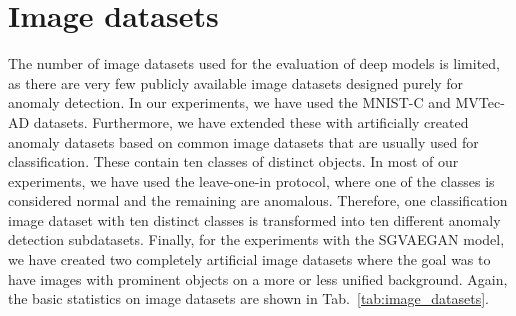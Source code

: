\section{Image datasets} \label{sec:image_datasets}
The number of image datasets used for the evaluation of deep models is limited, as there are very few publicly available image datasets designed purely for anomaly detection. In our experiments, we have used the MNIST-C and MVTec-AD datasets. Furthermore, we have extended these with artificially created anomaly datasets based on common image datasets that are usually used for classification. These contain ten classes of distinct objects. In most of our experiments, we have used the leave-one-in protocol, where one of the classes is considered normal and the remaining are anomalous. Therefore, one classification image dataset with ten distinct classes is transformed into ten different anomaly detection subdatasets. Finally, for the experiments with the SGVAEGAN model, we have created two completely artificial image datasets where the goal was to have images with prominent objects on a more or less unified background. Again, the basic statistics on image datasets are shown in Tab.~\ref{tab:image_datasets}.

